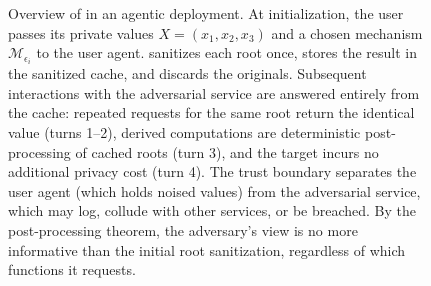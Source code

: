 \begin{figure}[t]

\caption{Overview of \sysname{} in an agentic deployment. At initialization, the user passes its private values $X = (x_1, x_2, x_3)$ and a chosen mechanism $\mathcal{M}_{\epsilon_i}$ to the user agent. \sysname{} sanitizes each root once, stores the result in the sanitized cache, and discards the originals. Subsequent interactions with the adversarial service are answered entirely from the cache: repeated requests for the same root return the identical value (turns 1--2), derived computations are deterministic post-processing of cached roots (turn 3), and the target incurs no additional privacy cost (turn 4). The trust boundary separates the user agent (which holds noised values) from the adversarial service, which may log, collude with other services, or be breached. By the post-processing theorem, the adversary's view is no more informative than the initial root sanitization, regardless of which functions it requests.}
\label{fig:rootguard_overview}
\end{figure}